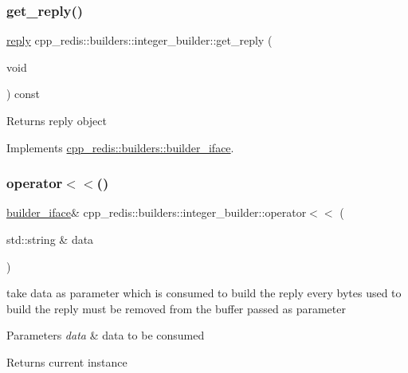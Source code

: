 \subsubsection{\texorpdfstring{get\+\_\+reply()}{get\_reply()}}
{\footnotesize\ttfamily \hyperlink{classcpp__redis_1_1reply}{reply} cpp\+\_\+redis\+::builders\+::integer\+\_\+builder\+::get\+\_\+reply (\begin{DoxyParamCaption}\item[{void}]{ }\end{DoxyParamCaption}) const\hspace{0.3cm}{\ttfamily [virtual]}}

\begin{DoxyReturn}{Returns}
reply object 
\end{DoxyReturn}


Implements \hyperlink{classcpp__redis_1_1builders_1_1builder__iface_afd2ff2c2371c2a486116543b638b9413}{cpp\+\_\+redis\+::builders\+::builder\+\_\+iface}.

\mbox{\label{classcpp__redis_1_1builders_1_1integer__builder_ae29f074134f7269db7f947b0fcbe312e}} 
\subsubsection{\texorpdfstring{operator$<$$<$()}{operator<<()}}
{\footnotesize\ttfamily \hyperlink{classcpp__redis_1_1builders_1_1builder__iface}{builder\+\_\+iface}\& cpp\+\_\+redis\+::builders\+::integer\+\_\+builder\+::operator$<$$<$ (\begin{DoxyParamCaption}\item[{std\+::string \&}]{data }\end{DoxyParamCaption})\hspace{0.3cm}{\ttfamily [virtual]}}

take data as parameter which is consumed to build the reply every bytes used to build the reply must be removed from the buffer passed as parameter


\begin{DoxyParams}{Parameters}
{\em data} & data to be consumed \\
\hline
\end{DoxyParams}
\begin{DoxyReturn}{Returns}
current instance 
\end{DoxyReturn}


